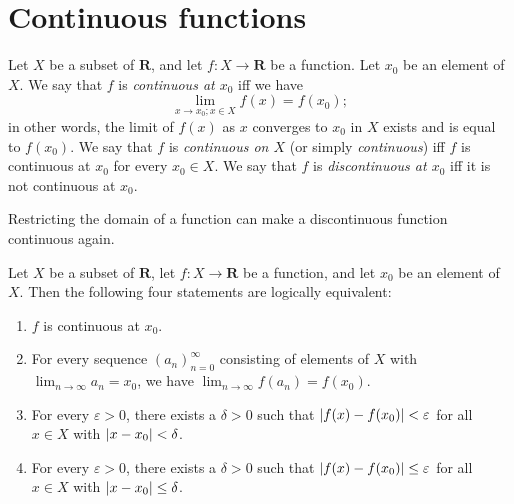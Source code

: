 \section{Continuous functions}\label{sec 9.4}

\begin{definition}[Continuity]\label{9.4.1}
    Let \(X\) be a subset of \(\mathbf{R}\), and let \(f : X \to \mathbf{R}\) be a function.
    Let \(x_0\) be an element of \(X\).
    We say that \(f\) is \emph{continuous at \(x_0\)} iff we have
    \[
        \lim_{x \to x_0 ; x \in X} f(x) = f(x_0);
    \]
    in other words, the limit of \(f(x)\) as \(x\) converges to \(x_0\) in \(X\) exists and is equal to \(f(x_0)\).
    We say that \(f\) is \emph{continuous on \(X\)} (or simply \emph{continuous}) iff \(f\) is continuous at \(x_0\) for every \(x_0 \in X\).
    We say that \(f\) is \emph{discontinuous at \(x_0\)} iff it is not continuous at \(x_0\).
\end{definition}

\begin{note}
    Restricting the domain of a function can make a discontinuous function continuous again.
\end{note}

\setcounter{theorem}{6}
\begin{proposition}\label{9.4.7}
    Let \(X\) be a subset of \(\mathbf{R}\), let \(f : X \to \mathbf{R}\) be a function, and let \(x_0\) be an element of \(X\).
    Then the following four statements are logically equivalent:
    \begin{enumerate}
        \item \(f\) is continuous at \(x_0\).
        \item For every sequence \((a_n)_{n = 0}^\infty\) consisting of elements of \(X\) with \(\lim_{n \to \infty} a_n = x_0\), we have \(\lim_{n \to \infty} f(a_n) = f(x_0)\).
        \item For every \(\varepsilon > 0\), there exists a \(\delta > 0\) such that \(\abs*{f(x) - f(x_0)} < \varepsilon\) for all \(x \in X\) with \(\abs*{x - x_0} < \delta\).
        \item For every \(\varepsilon > 0\), there exists a \(\delta > 0\) such that \(\abs*{f(x) - f(x_0)} \leq \varepsilon\) for all \(x \in X\) with \(\abs*{x - x_0} \leq \delta\).
    \end{enumerate}
\end{proposition}

